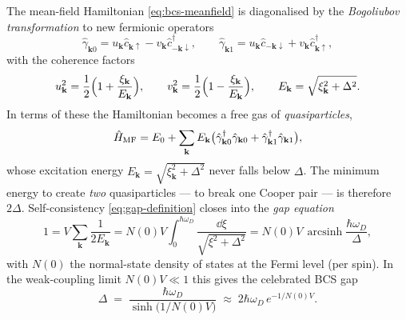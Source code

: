 \begin{statement}
\label{stmt:bogoliubov}
The mean-field Hamiltonian \cref{eq:bcs-meanfield} is diagonalised by
the \emph{Bogoliubov transformation} to new fermionic operators
\begin{equation}
\label{eq:bogoliubov-transform}
\hat\gamma_{\mathbf k0}
  = u_{\mathbf k}\hat c_{\mathbf k\uparrow}
  - v_{\mathbf k}\hat c^\dagger_{-\mathbf k\downarrow},
\qquad
\hat\gamma_{\mathbf k1}
  = u_{\mathbf k}\hat c_{-\mathbf k\downarrow}
  + v_{\mathbf k}\hat c^\dagger_{\mathbf k\uparrow},
\end{equation}
with the coherence factors
\begin{equation}
\label{eq:coherence-factors}
u_{\mathbf k}^2 = \frac12\Bigl(1+\frac{\xi_{\mathbf k}}{E_{\mathbf k}}\Bigr),
\qquad
v_{\mathbf k}^2 = \frac12\Bigl(1-\frac{\xi_{\mathbf k}}{E_{\mathbf k}}\Bigr),
\qquad
E_{\mathbf k}=\sqrt{\xi_{\mathbf k}^2+\Delta^2}.
\end{equation}
In terms of these the Hamiltonian becomes a free gas of
\emph{quasiparticles},
\begin{equation}
\label{eq:bcs-diagonal}
\hat{H}_{\rm MF}
= E_0 + \sum_{\mathbf k}E_{\mathbf k}\bigl(
  \hat\gamma^\dagger_{\mathbf k0}\hat\gamma_{\mathbf k0}
  + \hat\gamma^\dagger_{\mathbf k1}\hat\gamma_{\mathbf k1}\bigr),
\end{equation}
whose excitation energy $E_{\mathbf k}=\sqrt{\xi_{\mathbf k}^2+\Delta^2}$
never falls below $\Delta$. The minimum energy to create
\emph{two} quasiparticles --- to break one Cooper pair --- is
therefore $2\Delta$. Self-consistency \cref{eq:gap-definition} closes
into the \emph{gap equation}
\begin{equation}
\label{eq:gap-equation}
1 = V\sum_{\mathbf k}\frac{1}{2E_{\mathbf k}}
  = N(0)V\!\int_0^{\hbar\omega_D}\!\frac{\dd\xi}{\sqrt{\xi^2+\Delta^2}}
  = N(0)V\,\operatorname{arcsinh}\!\frac{\hbar\omega_D}{\Delta},
\end{equation}
with $N(0)$ the normal-state density of states at the Fermi level
(per spin). In the weak-coupling limit $N(0)V\ll1$ this gives the
celebrated BCS gap
\begin{equation}
\label{eq:bcs-gap}
\Delta \;=\; \frac{\hbar\omega_D}{\sinh\!\bigl(1/N(0)V\bigr)}
  \;\approx\; 2\hbar\omega_D\,e^{-1/N(0)V}.
\end{equation}
\end{statement}

